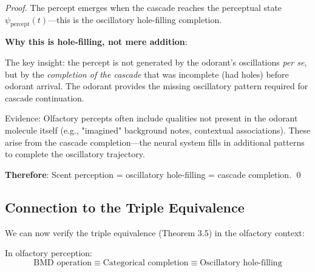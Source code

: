 \begin{proof}
The percept emerges when the cascade reaches the perceptual state $\psi_{\text{percept}}(t)$—this is the oscillatory hole-filling completion.

\textbf{Why this is hole-filling, not mere addition}:

The key insight: the percept is not generated by the odorant's oscillations \textit{per se}, but by the \textit{completion of the cascade} that was incomplete (had holes) before odorant arrival. The odorant provides the missing oscillatory pattern required for cascade continuation.

Evidence: Olfactory percepts often include qualities not present in the odorant molecule itself (e.g., "imagined" background notes, contextual associations). These arise from the cascade completion—the neural system fills in additional patterns to complete the oscillatory trajectory.

\textbf{Therefore}: Scent perception = oscillatory hole-filling = cascade completion. \qed
\end{proof}

\subsection{Connection to the Triple Equivalence}

We can now verify the triple equivalence (Theorem 3.5) in the olfactory context:

\begin{corollary}
\label{cor:olfactory_triple}
In olfactory perception:
\begin{equation}
\text{BMD operation} \equiv \text{Categorical completion} \equiv \text{Oscillatory hole-filling}
\end{equation}
\end{corollary}

